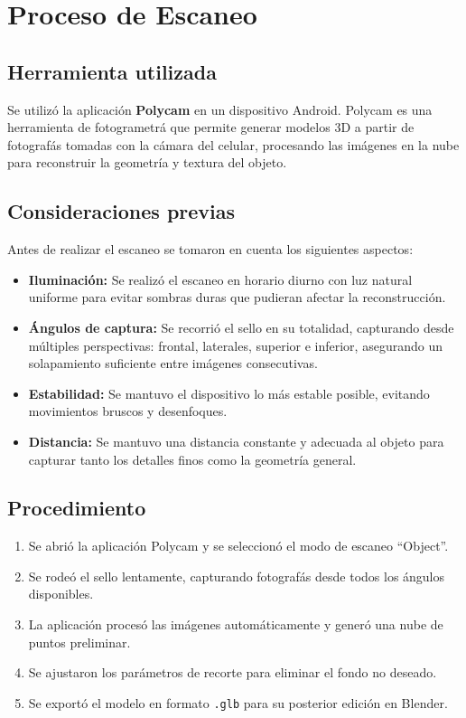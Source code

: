 \documentclass[12pt,a4paper]{article}
\begin{document}
\section{Proceso de Escaneo}

\subsection{Herramienta utilizada}

Se utiliz\'o la aplicaci\'on \textbf{Polycam} en un dispositivo Android. Polycam es una herramienta de fotogrametr\'a que permite generar modelos 3D a partir de fotograf\'as tomadas con la c\'amara del celular, procesando las im\'agenes en la nube para reconstruir la geometr\'ia y textura del objeto.

\subsection{Consideraciones previas}

Antes de realizar el escaneo se tomaron en cuenta los siguientes aspectos:

\begin{itemize}
    \item \textbf{Iluminaci\'on:} Se realiz\'o el escaneo en horario diurno con luz natural uniforme para evitar sombras duras que pudieran afectar la reconstrucci\'on.
    \item \textbf{\'Angulos de captura:} Se recorri\'o el sello en su totalidad, capturando desde m\'ultiples perspectivas: frontal, laterales, superior e inferior, asegurando un solapamiento suficiente entre im\'agenes consecutivas.
    \item \textbf{Estabilidad:} Se mantuvo el dispositivo lo m\'as estable posible, evitando movimientos bruscos y desenfoques.
    \item \textbf{Distancia:} Se mantuvo una distancia constante y adecuada al objeto para capturar tanto los detalles finos como la geometr\'ia general.
\end{itemize}

\subsection{Procedimiento}

\begin{enumerate}
    \item Se abri\'o la aplicaci\'on Polycam y se seleccion\'o el modo de escaneo ``Object''.
    \item Se rode\'o el sello lentamente, capturando fotograf\'as desde todos los \'angulos disponibles.
    \item La aplicaci\'on proces\'o las im\'agenes autom\'aticamente y gener\'o una nube de puntos preliminar.
    \item Se ajustaron los par\'ametros de recorte para eliminar el fondo no deseado.
    \item Se export\'o el modelo en formato \texttt{.glb} para su posterior edici\'on en Blender.
\end{enumerate}
\end{document}
